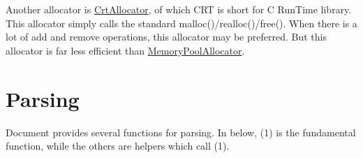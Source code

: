 Another allocator is {\ttfamily \hyperlink{class_crt_allocator}{Crt\+Allocator}}, of which C\+RT is short for C Run\+Time library. This allocator simply calls the standard {\ttfamily malloc()}/{\ttfamily realloc()}/{\ttfamily free()}. When there is a lot of add and remove operations, this allocator may be preferred. But this allocator is far less efficient than {\ttfamily \hyperlink{class_memory_pool_allocator}{Memory\+Pool\+Allocator}}.\hypertarget{md_Commun_Externe_RapidJSON_doc_sax.zh-cn_Parsing}{}\section{Parsing}\label{md_Commun_Externe_RapidJSON_doc_sax.zh-cn_Parsing}
{\ttfamily Document} provides several functions for parsing. In below, (1) is the fundamental function, while the others are helpers which call (1).


